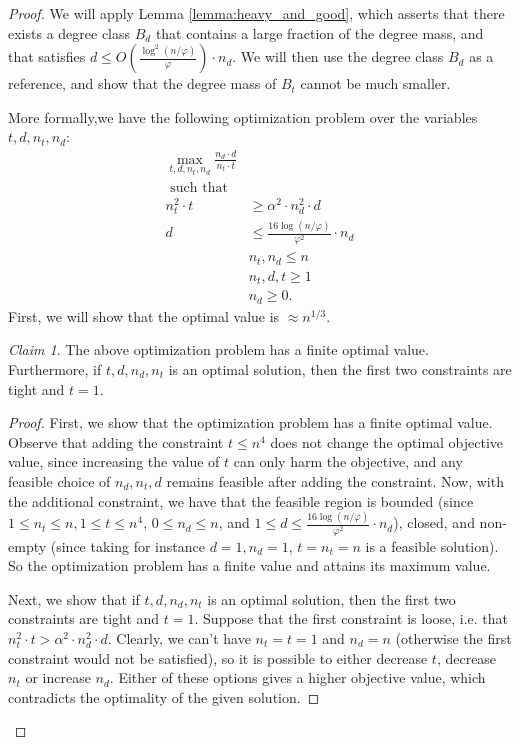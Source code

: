 \documentclass[letterpaper,11pt]{article}
\theoremstyle{plain}
\theoremstyle{definition}
\theoremstyle{remark}
\newtheorem{claim}{Claim}
\begin{document}
\begin{proof}
We will apply Lemma \ref{lemma:heavy_and_good}, which asserts that there exists a degree class $B_d$ that contains a large fraction of the degree mass, 
and that satisfies $d \leq  O\left(\frac{\log^2(n/\varphi)}{\varphi}\right) \cdot n_d$. We will then use the degree class $B_d$ as a reference, and show that the degree mass of $B_t$ cannot be much smaller. 

More formally,we have the following optimization problem over the variables $t,d,n_t, n_d$: 
\begin{align*}
      \max_{t,d, n_t, n_d} \frac{n_d \cdot d}{n_t \cdot t}  & \quad  \\
      \text{ such that}&\\
       n_t^2 \cdot t & \geq \alpha^2
       \cdot n_d^2\cdot  d \\
      d & \leq  \frac{16 \log (n/\varphi)}{\varphi^2} \cdot n_d \\
     &   n_t, n_d \leq n  \\
    &   n_t,d, t \geq 1  \\
      &   n_d\geq 0 . 
\end{align*}
First, we will show that the optimal value is $\approx n^{1/3}$. 
\begin{claim}\label{claim:optimization}
    The above optimization problem has a finite optimal value. Furthermore, if $t,d,n_d, n_t$ is an optimal solution, then the first two constraints are tight and $t=1$. 
\end{claim}
\begin{proof}
First, we show that the optimization problem has a finite optimal value. Observe that adding the constraint $t \leq n^4$ does not change the optimal objective value, since increasing the value of $t$ can only harm the objective, and any feasible choice of $n_d, n_t, d$ remains feasible after adding the constraint. Now, with the additional constraint, we have that the feasible region is bounded (since $1 \leq n_t \leq n, 1 \leq t \leq n^4 $, $0 \leq n_d \leq n$, and $1 \leq d \leq  \frac{16 \log(n/\varphi)}{\varphi^2} \cdot n_d$), closed, and non-empty (since taking for instance $d =1, n_d = 1$, $t = n_t = n$ is a feasible solution). So the optimization problem has a finite value and attains its maximum value. 

Next, we show that if $t,d,n_d, n_t$ is an optimal solution, then the first two constraints are tight and $t=1$. Suppose that the first constraint is loose, i.e. that $n_t^2 \cdot t > \alpha^2 \cdot n_d^2 \cdot  d$. Clearly, we can't have $n_t = t=1$ and $n_d = n$ (otherwise the first constraint would not be satisfied), so it is possible to either decrease $t$, decrease $n_t$ or increase $n_d$. Either of these options gives a higher objective value, which contradicts the optimality of the given solution.


\end{proof}
\end{proof}
\end{document}
